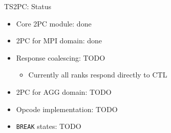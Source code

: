 \documentclass[
  ignorenonframetext,
]{beamer}
\providecommand{\tightlist}{%
  \setlength{\itemsep}{0pt}\setlength{\parskip}{0pt}}\usepackage{longtable,booktabs,array}
\begin{document}
\begin{frame}[fragile]{TS2PC: Status}
\label{ts2pc-status}
\begin{itemize}
\tightlist
\item
  Core 2PC module: done
\item
  2PC for MPI domain: done
\item
  Response coalescing: TODO

  \begin{itemize}
  \tightlist
  \item
    Currently all ranks respond directly to CTL
  \end{itemize}
\item
  2PC for AGG domain: TODO
\item
  Opcode implementation: TODO
\item
  \texttt{BREAK} states: TODO
\end{itemize}
\end{frame}
\end{document}
